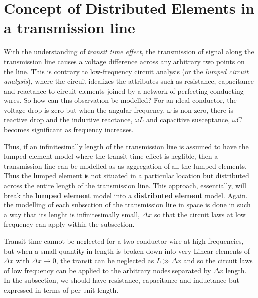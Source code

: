 \section{Concept of Distributed Elements in a transmission line}
With the understanding of \textit{transit time effect}, the transmission of signal along the transmission line causes a voltage difference across any arbitrary two points on the line. This is contrary to low-frequency circuit analysis (or the \textit{lumped circuit analysis}), where the circuit idealizes the attributes such as resistance, capacitance and reactance to circuit elements joined by a network of perfecting conducting wires. So how can this observation be modelled? For an ideal conductor, the voltage drop is zero but when the angular frequency, $\omega$ is non-zero, there is reactive drop and the inductive reactance, $\omega L$ and capacitive susceptance, $\omega C$ becomes significant as frequency increases.

Thus, if an infinitesimally length of the transmission line is assumed to have the lumped element model where the transit time effect is neglible, then a transmission line can be modelled as as aggregation of all the lumped elements. Thus the lumped element is not situated in a particular location but distributed across the entire length of the transmission line. This approach, essentially, will break the \textbf{lumped element} model into a \textbf{distributed element} model. Again, the modelling of each subsection of the transmission line in space is done in such a way that its lenght is infinitesimally small, $\Delta x$ so that the circuit laws at low frequency can apply within the subsection.

Transit time cannot be neglected for a two-conductor wire at high frequencies, but when a small quantity in length is broken down into very Linear elements of $ \Delta x $ with  $  \Delta x \rightarrow 0 $, the transit can be neglected as $ L \gg \Delta x $ and so the circuit laws of low frequency can be applied to the arbitrary nodes separated by $ \Delta x $ length. In the subsection, we should have resistance, capacitance and inductance but expressed in terms of per unit length.

